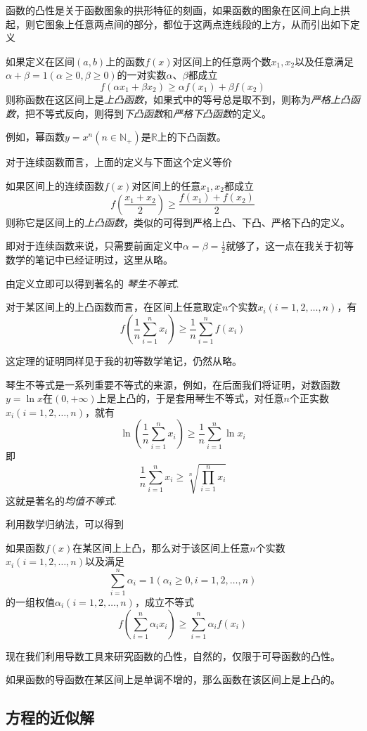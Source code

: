 函数的凸性是关于函数图象的拱形特征的刻画，如果函数的图象在区间上向上拱起，则它图象上任意两点间的部分，都位于这两点连线段的上方，从而引出如下定义
\begin{definition}
  如果定义在区间$(a,b)$上的函数$f(x)$对区间上的任意两个数$x_1,x_2$以及任意满足$\alpha+\beta=1(\alpha \geqslant 0,\beta \geqslant 0)$的一对实数$\alpha$、$\beta$都成立
  \[ f(\alpha x_1+\beta x_2) \geqslant \alpha f(x_1) + \beta f(x_2) \]
  则称函数在这区间上是\emph{上凸函数}，如果式中的等号总是取不到，则称为\emph{严格上凸函数}，把不等式反向，则得到\emph{下凸函数}和\emph{严格下凸函数}的定义。
\end{definition}

例如，幂函数$y=x^n(n \in \mathbb{N}_+)$是$\mathbb{R}$上的下凸函数。

对于连续函数而言，上面的定义与下面这个定义等价
\begin{definition}
  如果区间上的连续函数$f(x)$对区间上的任意$x_1,x_2$都成立
  \[ f \left( \frac{x_1+x_2}{2} \right) \geqslant \frac{f(x_1)+f(x_2)}{2} \]
  则称它是区间上的\emph{上凸函数}，类似的可得到严格上凸、下凸、严格下凸的定义。
\end{definition}

即对于连续函数来说，只需要前面定义中$\alpha=\beta=\frac{1}{2}$就够了，这一点在我关于初等数学的笔记中已经证明过，这里从略。

由定义立即可以得到著名的 \emph{琴生不等式}.
\begin{theorem}
  对于某区间上的上凸函数而言，在区间上任意取定$n$个实数$x_i(i=1,2,\ldots,n)$，有
  \[ f \left( \frac{1}{n} \sum_{i=1}^n x_i \right) \geqslant \frac{1}{n} \sum_{i=1}^n f(x_i) \]
\end{theorem}

这定理的证明同样见于我的初等数学笔记，仍然从略。

\begin{example}
  琴生不等式是一系列重要不等式的来源，例如，在后面我们将证明，对数函数$y=\ln{x}$在$(0,+\infty)$上是上凸的，于是套用琴生不等式，对任意$n$个正实数$x_i(i=1,2,\ldots,n)$，就有
  \[ \ln{\left( \frac{1}{n} \sum_{i=1}^n x_i \right)} \geqslant \frac{1}{n} \sum_{i=1}^n \ln{x_i} \]
  即
  \[ \frac{1}{n} \sum_{i=1}^n x_i \geqslant \sqrt[n]{\prod_{i=1}^n x_i} \]
  这就是著名的\emph{均值不等式}.
\end{example}

利用数学归纳法，可以得到
\begin{theorem}
  如果函数$f(x)$在某区间上上凸，那么对于该区间上任意$n$个实数$x_i(i=1,2,\ldots,n)$以及满足
  \[ \sum_{i=1}^n \alpha_i=1(\alpha_i \geqslant 0,i=1,2,\ldots,n) \]
  的一组权值$\alpha_i(i=1,2,\ldots,n)$，成立不等式
  \[ f \left( \sum_{i=1}^n \alpha_i x_i \right) \geqslant \sum_{i=1}^n \alpha_i f(x_i) \]
\end{theorem}

现在我们利用导数工具来研究函数的凸性，自然的，仅限于可导函数的凸性。

\begin{theorem}
  如果函数的导函数在某区间上是单调不增的，那么函数在该区间上是上凸的。
\end{theorem}

\subsection{方程的近似解}
\label{sec:approx-solve-of-equation}





